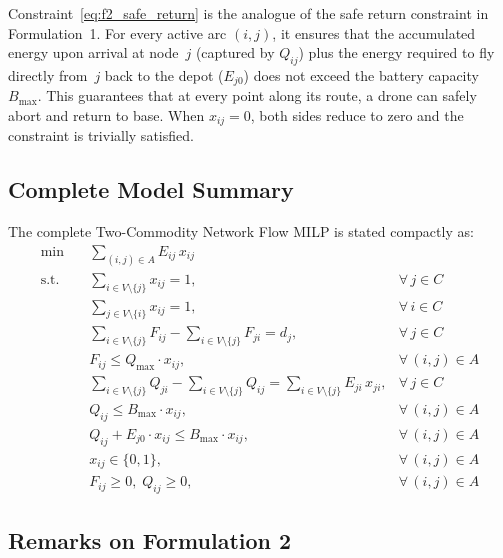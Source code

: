 \documentclass[11pt,a4paper]{article}
\begin{document}
Constraint~\eqref{eq:f2_safe_return} is the analogue of the safe return constraint in Formulation~1. For every active arc $(i,j)$, it ensures that the accumulated energy upon arrival at node~$j$ (captured by $Q_{ij}$) plus the energy required to fly directly from~$j$ back to the depot ($E_{j0}$) does not exceed the battery capacity $B_{\max}$. This guarantees that at every point along its route, a drone can safely abort and return to base. When $x_{ij} = 0$, both sides reduce to zero and the constraint is trivially satisfied.

\subsection{Complete Model Summary}

The complete Two-Commodity Network Flow MILP is stated compactly as:
\begin{align}
  \min \quad & \sum_{(i,j) \in A} E_{ij} \, x_{ij} \label{eq:f2_full_obj}\\[6pt]
  \text{s.t.} \quad & \sum_{i \in V \setminus \{j\}} x_{ij} = 1, & \forall\, j \in C \label{eq:f2_full_indeg}\\
  & \sum_{j \in V \setminus \{i\}} x_{ij} = 1, & \forall\, i \in C \label{eq:f2_full_outdeg}\\
  & \sum_{i \in V \setminus \{j\}} F_{ij} - \sum_{i \in V \setminus \{j\}} F_{ji} = d_j, & \forall\, j \in C \label{eq:f2_full_payload}\\
  & F_{ij} \le Q_{\max} \cdot x_{ij}, & \forall\, (i,j) \in A \label{eq:f2_full_pcap}\\
  & \sum_{i \in V \setminus \{j\}} Q_{ji} - \sum_{i \in V \setminus \{j\}} Q_{ij} = \sum_{i \in V \setminus \{j\}} E_{ji} \, x_{ji}, & \forall\, j \in C \label{eq:f2_full_energy}\\
  & Q_{ij} \le B_{\max} \cdot x_{ij}, & \forall\, (i,j) \in A \label{eq:f2_full_bcap}\\
  & Q_{ij} + E_{j0} \cdot x_{ij} \le B_{\max} \cdot x_{ij}, & \forall\, (i,j) \in A \label{eq:f2_full_safe}\\
  & x_{ij} \in \{0, 1\}, & \forall\, (i,j) \in A \label{eq:f2_full_bin}\\
  & F_{ij} \ge 0,\; Q_{ij} \ge 0, & \forall\, (i,j) \in A \label{eq:f2_full_cont}
\end{align}

\subsection{Remarks on Formulation 2}
\end{document}

